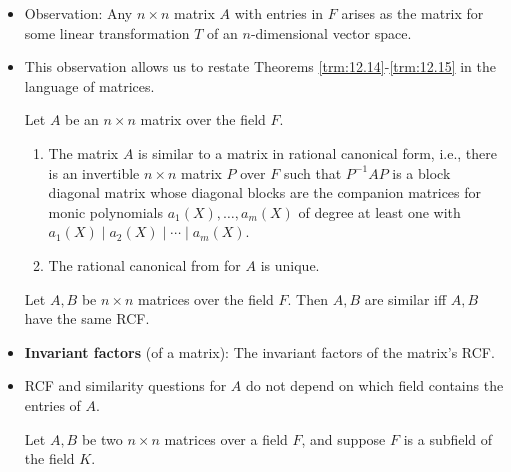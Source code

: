\documentclass[../notes.tex]{subfiles}
\begin{document}
\begin{itemize}
\begin{theorem}
        \begin{enumerate}
            \item $S$ and $T$ are similar linear transformations.
            \item The $F[X]$-modules obtained from $V$ via $S$ and via $T$ are isomorphic $F[X]$-modules.
            \item $S$ and $T$ have the same rational canonical form.
        \end{enumerate}
        \begin{proof}
            Given.
        \end{proof}
    \end{theorem}
    \item Observation: Any $n\times n$ matrix $A$ with entries in $F$ arises as the matrix for some linear transformation $T$ of an $n$-dimensional vector space.
    \item This observation allows us to restate Theorems \ref{trm:12.14}-\ref{trm:12.15} in the language of matrices.
    \begin{theorem}\label{trm:12.16}
        Let $A$ be an $n\times n$ matrix over the field $F$.
        \begin{enumerate}
            \item The matrix $A$ is similar to a matrix in rational canonical form, i.e., there is an invertible $n\times n$ matrix $P$ over $F$ such that $P^{-1}AP$ is a block diagonal matrix whose diagonal blocks are the companion matrices for monic polynomials $a_1(X),\dots,a_m(X)$ of degree at least one with $a_1(X)\mid a_2(X)\mid\cdots\mid a_m(X)$.
            \item The rational canonical from for $A$ is unique.
        \end{enumerate}
    \end{theorem}
    \begin{theorem}\label{trm:12.17}
        Let $A,B$ be $n\times n$ matrices over the field $F$. Then $A,B$ are similar iff $A,B$ have the same RCF.
    \end{theorem}
    \item \textbf{Invariant factors} (of a matrix): The invariant factors of the matrix's RCF.
    \item RCF and similarity questions for $A$ do not depend on which field contains the entries of $A$.
    \begin{corollary}\label{cly:12.18}
        Let $A,B$ be two $n\times n$ matrices over a field $F$, and suppose $F$ is a subfield of the field $K$.

\end{corollary}
\end{itemize}
\end{document}
